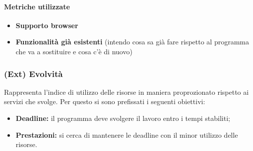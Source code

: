\paragraph{Metriche utilizzate}
\begin{itemize}
	\item \textbf{Supporto browser}
	\item \textbf{Funzionalità già esistenti} (intendo cosa sa già fare rispetto al programma che va a sostituire e cosa c'è di nuovo)
\end{itemize}
\begin{table}[!htpb]
\end{table}
\subsubsection{(Ext) Evolvità}
Rappresenta l'indice di utilizzo delle risorse in maniera proprozionato rispetto ai servizi che svolge. Per questo si sono prefissati i seguenti obiettivi:
\begin{itemize}
	\item{\textbf{Deadline:}  il programma deve svolgere il lavoro entro i tempi stabiliti;}
	\item{\textbf{Prestazioni:} si cerca di mantenere le deadline con il minor utilizzo delle risorse.}
\end{itemize}
\begin{table}[!htpb]
\end{table}